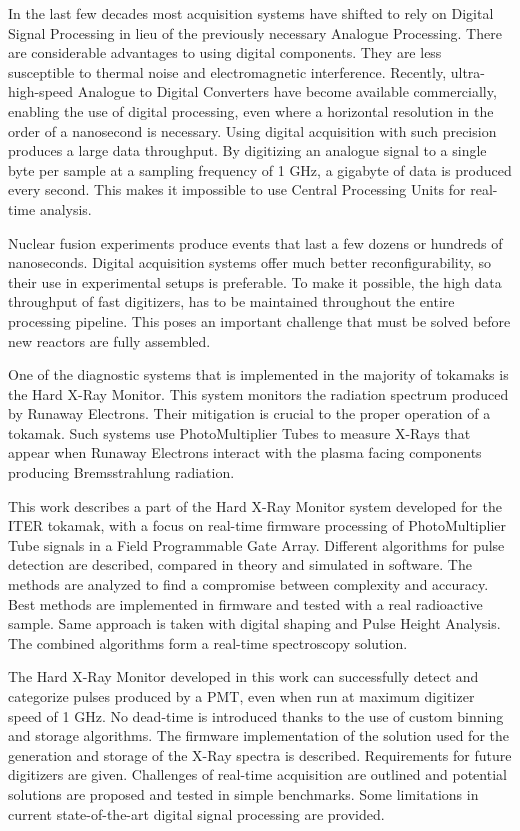 In the last few decades most acquisition systems have 
shifted to rely on Digital Signal Processing in lieu of the
previously necessary Analogue Processing. There are considerable
advantages to using digital components. They are less 
susceptible to thermal noise and electromagnetic interference.
Recently, ultra-high-speed Analogue to Digital Converters
have become available commercially, enabling the use of
digital processing, even where a horizontal resolution 
in the order of a nanosecond is necessary.
Using digital acquisition with such precision 
produces a large data throughput. By digitizing an analogue signal
to a single byte per sample at a sampling frequency of 1 GHz,
a gigabyte of data is produced every second. This makes it 
impossible to use Central Processing Units for real-time analysis.


Nuclear fusion experiments produce events that last
a few dozens or hundreds of nanoseconds. Digital acquisition systems
offer much better reconfigurability, so their use in experimental 
setups is preferable. To make it possible, the high data throughput 
of fast digitizers, has to be maintained throughout the entire processing pipeline.
This poses an important challenge that must be solved before 
new reactors are fully assembled.


One of the diagnostic systems that is implemented in the majority
of tokamaks is the Hard X-Ray Monitor. This system monitors the 
radiation spectrum produced by Runaway Electrons. Their mitigation
is crucial to the proper operation of a tokamak. Such systems
use PhotoMultiplier Tubes to measure X-Rays that appear when 
Runaway Electrons interact with the plasma facing components
producing Bremsstrahlung radiation.


This work describes a part of the Hard X-Ray Monitor system developed for 
the ITER tokamak, with a focus on real-time firmware processing
of PhotoMultiplier Tube signals in a Field Programmable Gate Array.
Different algorithms for pulse detection are described, compared 
in theory and simulated in software.
The methods are analyzed to find a compromise between complexity and accuracy.
Best methods are implemented in firmware and tested with a real radioactive sample.
Same approach is taken with digital shaping and Pulse Height Analysis.
The combined algorithms form a real-time spectroscopy solution.


The Hard X-Ray Monitor developed in this work can successfully 
detect and categorize pulses produced by a PMT, even when 
run at maximum digitizer speed of 1 GHz. No dead-time is 
introduced thanks to the use of custom binning and storage algorithms.
The firmware implementation of the solution used for the generation and storage of
the X-Ray spectra is described. Requirements for future digitizers are given.
Challenges of real-time acquisition are outlined and potential solutions
are proposed and tested in simple benchmarks. Some limitations in
current state-of-the-art digital signal processing are provided.

